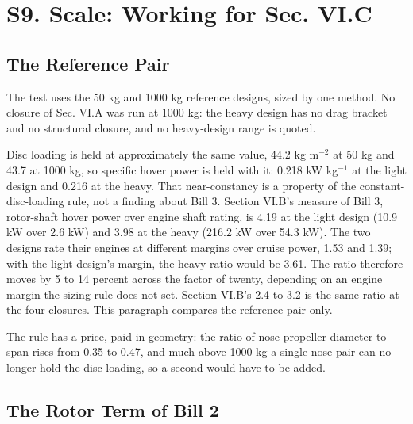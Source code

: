\documentclass[journal]{new-aiaa}
\begin{document}
\section*{S9. Scale: Working for Sec. VI.C}

\subsection*{The Reference Pair}

The test uses the 50 kg and 1000 kg reference designs, sized by one method. No closure of Sec. VI.A was run at 1000 kg: the heavy design has no drag bracket and no structural closure, and no heavy-design range is quoted.

Disc loading is held at approximately the same value, 44.2 kg m$^{-2}$ at 50 kg and 43.7 at 1000 kg, so specific hover power is held with it: 0.218 kW kg$^{-1}$ at the light design and 0.216 at the heavy. That near-constancy is a property of the constant-disc-loading rule, not a finding about Bill 3. Section VI.B's measure of Bill 3, rotor-shaft hover power over engine shaft rating, is 4.19 at the light design (10.9 kW over 2.6 kW) and 3.98 at the heavy (216.2 kW over 54.3 kW). The two designs rate their engines at different margins over cruise power, 1.53 and 1.39; with the light design's margin, the heavy ratio would be 3.61. The ratio therefore moves by 5 to 14 percent across the factor of twenty, depending on an engine margin the sizing rule does not set. Section VI.B's 2.4 to 3.2 is the same ratio at the four closures. This paragraph compares the reference pair only.

The rule has a price, paid in geometry: the ratio of nose-propeller diameter to span rises from 0.35 to 0.47, and much above 1000 kg a single nose pair can no longer hold the disc loading, so a second would have to be added.

\subsection*{The Rotor Term of Bill 2}
\end{document}

